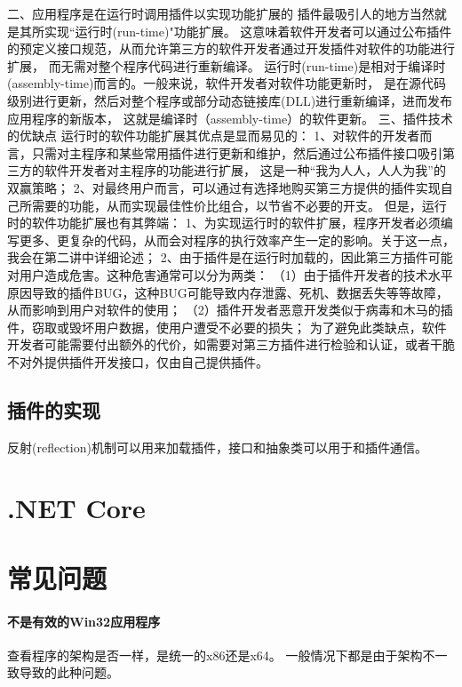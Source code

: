 \documentclass{book}
\begin{document}
二、应用程序是在运行时调用插件以实现功能扩展的
插件最吸引人的地方当然就是其所实现“运行时(run-time)"功能扩展。
这意味着软件开发者可以通过公布插件的预定义接口规范，从而允许第三方的软件开发者通过开发插件对软件的功能进行扩展，
而无需对整个程序代码进行重新编译。
运行时(run-time)是相对于编译时(assembly-time)而言的。一般来说，软件开发者对软件功能更新时，
是在源代码级别进行更新，然后对整个程序或部分动态链接库(DLL)进行重新编译，进而发布应用程序的新版本，
这就是编译时（assembly-time）的软件更新。
三、插件技术的优缺点
运行时的软件功能扩展其优点是显而易见的：
1、对软件的开发者而言，只需对主程序和某些常用插件进行更新和维护，然后通过公布插件接口吸引第三方的软件开发者对主程序的功能进行扩展，
这是一种“我为人人，人人为我”的双赢策略；
2、对最终用户而言，可以通过有选择地购买第三方提供的插件实现自己所需要的功能，从而实现最佳性价比组合，以节省不必要的开支。
但是，运行时的软件功能扩展也有其弊端：
1、为实现运行时的软件扩展，程序开发者必须编写更多、更复杂的代码，从而会对程序的执行效率产生一定的影响。关于这一点，我会在第二讲中详细论述；
2、由于插件是在运行时加载的，因此第三方插件可能对用户造成危害。这种危害通常可以分为两类：
（1）由于插件开发者的技术水平原因导致的插件BUG，这种BUG可能导致内存泄露、死机、数据丢失等等故障，从而影响到用户对软件的使用；
（2）插件开发者恶意开发类似于病毒和木马的插件，窃取或毁坏用户数据，使用户遭受不必要的损失；
为了避免此类缺点，软件开发者可能需要付出额外的代价，如需要对第三方插件进行检验和认证，或者干脆不对外提供插件开发接口，仅由自己提供插件。

\subsection{插件的实现}

反射(reflection)机制可以用来加载插件，接口和抽象类可以用于和插件通信。

\section{.NET Core}



\section{常见问题}

\paragraph{不是有效的Win32应用程序}查看程序的架构是否一样，是统一的x86还是x64。
一般情况下都是由于架构不一致导致的此种问题。
\end{document}
